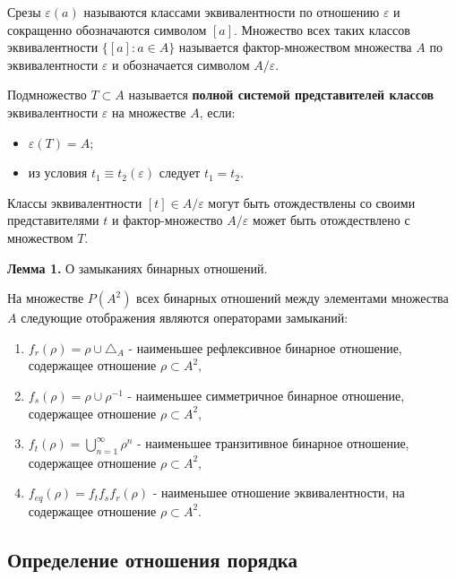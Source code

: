 \documentclass[bachelor, och, labwork]{shiza}
\begin{document}
        Срезы $\varepsilon(a)$ называются классами эквивалентности по отношению $\varepsilon$ и сокращенно обозначаются символом $[a]$. Множество всех таких классов эквивалентности $\{[a]: a \in A\}$ называется фактор-множеством множества $A$ по эквивалентности $\varepsilon$ и обозначается символом $A/\varepsilon$.

        Подмножество $T \subset A$ называется \textbf{полной системой представителей классов} эквивалентности $\varepsilon$ на множестве $A$, если:
        
        \begin{itemize}
            \item $\varepsilon(T) = A$;
            \item из условия $t_1 \equiv t_2(\varepsilon)$ следует $t_1 = t_2$.
        \end{itemize}

        Классы эквивалентности $[t] \in A/\varepsilon$ могут быть отождествлены со своими представителями $t$ и фактор-множество $A/\varepsilon$ 
        может быть отождествлено с множеством $T$.

        \textbf{Лемма 1.} О замыканиях бинарных отношений.

        На множестве $P(A^2)$ всех бинарных отношений между элементами множества $A$ следующие отображения являются
        операторами замыканий:

        \begin{enumerate}
            \item $f_r(\rho) = \rho \cup \triangle_A$ - наименьшее рефлексивное бинарное отношение, содержащее отношение
            $\rho \subset A^2$,
            \item $f_s(\rho) = \rho \cup \rho^{-1}$ - наименьшее симметричное бинарное отношение, содержащее отношение
            $\rho \subset A^2$,
            \item $f_t(\rho) = \bigcup^\infty_{n=1} \rho^{n}$ - наименьшее транзитивное бинарное отношение, содержащее
            отношение $\rho \subset A^2$,
            \item $f_{eq}(\rho) = f_t f_s f_r(\rho)$ - наименьшее отношение эквивалентности, на содержащее отношение
            $\rho \subset A^2$.
        \end{enumerate}        

    \subsection{Определение отношения порядка}
\end{document}
